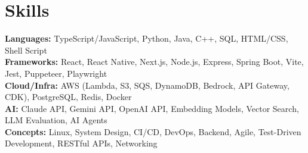 \documentclass[letterpaper,11pt]{article}
\begin{document}
\section{Skills}
 \begin{itemize}[leftmargin=0.15in, label={}]
    \small{\item{
         \textbf{Languages:}{ TypeScript/JavaScript, Python, Java, C++, SQL, HTML/CSS, Shell Script} \\
     \textbf{Frameworks:}{ React, React Native, Next.js, Node.js, Express, Spring Boot, Vite, Jest, Puppeteer, Playwright} \\
     \textbf{Cloud/Infra:}{ AWS (Lambda, S3, SQS, DynamoDB, Bedrock, API Gateway, CDK), PostgreSQL, Redis, Docker} \\
     \textbf{AI:}{ Claude API, Gemini API, OpenAI API, Embedding Models, Vector Search, LLM Evaluation, AI Agents} \\
     \textbf{Concepts:}{ Linux, System Design, CI/CD, DevOps, Backend, Agile, Test-Driven Development, RESTful APIs, Networking}
    }}
 \end{itemize}
\end{document}
